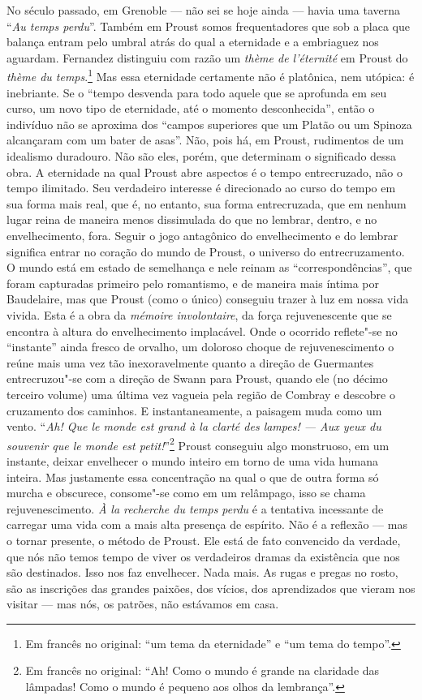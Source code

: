 No século passado, em Grenoble --- não sei se hoje ainda --- havia uma
taverna ``\emph{Au temps perdu}''. Também em Proust somos
frequentadores que sob a placa que balança entram pelo umbral atrás
do qual a eternidade e a embriaguez nos aguardam. Fernandez distinguiu
com razão um \emph{thème de l'éternité} em Proust do \emph{thème du
temps}.\footnote{Em francês no original: ``um tema da eternidade'' e ``um tema do tempo''. \versal{[N.~T.]}}
Mas essa eternidade certamente não é platônica, nem utópica: é
inebriante. Se o ``tempo desvenda para todo aquele que se aprofunda em
seu curso, um novo tipo de eternidade, até o momento desconhecida'',
então o indivíduo não se aproxima dos ``campos superiores que um Platão
ou um Spinoza alcançaram com um bater de asas''. Não, pois há, em Proust,
rudimentos de um idealismo duradouro. Não são eles, porém, que
determinam o significado dessa obra. A eternidade na qual Proust abre
aspectos é o tempo entrecruzado, não o tempo ilimitado. Seu verdadeiro
interesse é direcionado ao curso do tempo em sua forma mais real, que é,
no entanto, sua forma entrecruzada, que em nenhum lugar reina de maneira
menos dissimulada do que no lembrar, dentro, e no envelhecimento, fora.
Seguir o jogo antagônico do envelhecimento e do lembrar significa entrar
no coração do mundo de Proust, o universo do entrecruzamento. O mundo
está em estado de semelhança e nele reinam as ``correspondências'', que
foram capturadas primeiro pelo romantismo, e de maneira mais íntima por
Baudelaire, mas que Proust (como o único) conseguiu trazer à luz em
nossa vida vivida. Esta é a obra da \emph{mémoire involontaire}, da
força rejuvenescente que se encontra à altura do envelhecimento
implacável. Onde o ocorrido reflete"-se no ``instante'' ainda fresco de
orvalho, um doloroso choque de rejuvenescimento o reúne mais uma vez tão
inexoravelmente quanto a direção de Guermantes entrecruzou"-se com a
direção de Swann para Proust, quando ele (no décimo terceiro volume) uma
última vez vagueia pela região de Combray e descobre o cruzamento dos
caminhos. E instantaneamente, a paisagem muda como um vento. ``\emph{Ah! Que
le monde est grand à la clarté des lampes! --- Aux yeux du
souvenir que le monde est petit!}''\footnote{Em francês no original: ``Ah! Como o mundo é
  grande na claridade das lâmpadas! Como o mundo é pequeno aos olhos da
  lembrança''. \versal{[N.~T.]}} Proust conseguiu algo monstruoso, em um instante, deixar
envelhecer o mundo inteiro em torno de uma vida humana inteira. Mas
justamente essa concentração na qual o que de outra forma só murcha e
obscurece, consome"-se como em um relâmpago, isso se chama
rejuvenescimento. \emph{À la recherche du temps perdu} é a tentativa
incessante de carregar uma vida com a mais alta presença de espírito.
Não é a reflexão --- mas o tornar presente, o método de Proust. Ele está
de fato convencido da verdade, que nós não temos tempo de viver os
verdadeiros dramas da existência que nos são destinados. Isso nos faz
envelhecer. Nada mais. As rugas e pregas no rosto, são as inscrições das
grandes paixões, dos vícios, dos aprendizados que vieram nos visitar ---
mas nós, os patrões, não estávamos em casa.

